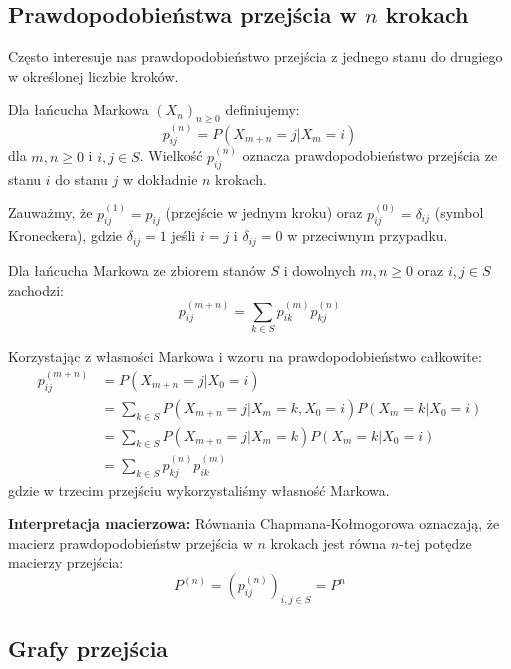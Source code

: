 \documentclass[final,a4paper,openany,12pt]{mwbk}
\begin{document}
\subsection{Prawdopodobieństwa przejścia w $n$ krokach}

Często interesuje nas prawdopodobieństwo przejścia z jednego stanu do drugiego w określonej liczbie kroków.

\begin{Def}
Dla łańcucha Markowa $(X_n)_{n \geq 0}$ definiujemy:
$$p_{ij}^{(n)} = P(X_{m+n} = j | X_m = i)$$
dla $m, n \geq 0$ i $i, j \in S$. Wielkość $p_{ij}^{(n)}$ oznacza prawdopodobieństwo przejścia ze stanu $i$ do stanu $j$ w dokładnie $n$ krokach.
\end{Def}

Zauważmy, że $p_{ij}^{(1)} = p_{ij}$ (przejście w jednym kroku) oraz $p_{ij}^{(0)} = \delta_{ij}$ (symbol Kroneckera), gdzie $\delta_{ij} = 1$ jeśli $i = j$ i $\delta_{ij} = 0$ w przeciwnym przypadku.

\begin{Tw}
Dla łańcucha Markowa ze zbiorem stanów $S$ i dowolnych $m, n \geq 0$ oraz $i, j \in S$ zachodzi:
$$p_{ij}^{(m+n)} = \sum_{k \in S} p_{ik}^{(m)} p_{kj}^{(n)}$$
\end{Tw}

\begin{Dow}
Korzystając z własności Markowa i wzoru na prawdopodobieństwo całkowite:
\begin{align}
p_{ij}^{(m+n)} &= P(X_{m+n} = j | X_0 = i) \\
&= \sum_{k \in S} P(X_{m+n} = j | X_m = k, X_0 = i) P(X_m = k | X_0 = i) \\
&= \sum_{k \in S} P(X_{m+n} = j | X_m = k) P(X_m = k | X_0 = i) \\
&= \sum_{k \in S} p_{kj}^{(n)} p_{ik}^{(m)}
\end{align}
gdzie w trzecim przejściu wykorzystaliśmy własność Markowa.
\end{Dow}

\textbf{Interpretacja macierzowa:} Równania Chapmana-Kołmogorowa oznaczają, że macierz prawdopodobieństw przejścia w $n$ krokach jest równa $n$-tej potędze macierzy przejścia:
$$P^{(n)} = (p_{ij}^{(n)})_{i,j \in S} = P^n$$

\subsection{Grafy przejścia}
\end{document}
